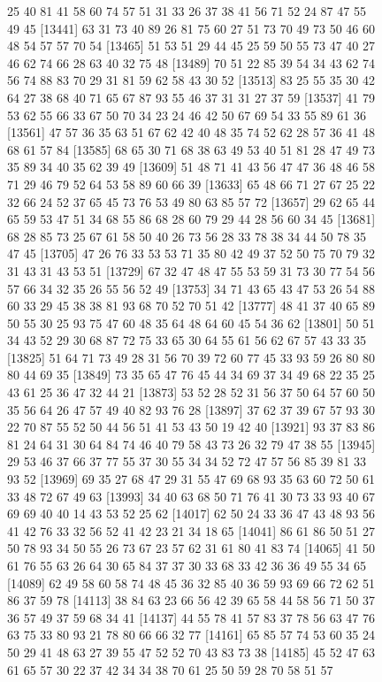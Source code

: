 \documentclass{article}
\begin{document}
\begin{figure}[H]
\begin{Schunk}
\begin{Soutput}
[13417] 25 40 81 41 58 60 74 57 51 31 33 26 37 38 41 56 71 52 24 87 47 55 49 45
[13441] 63 31 73 40 89 26 81 75 60 27 51 73 70 49 73 50 46 60 48 54 57 57 70 54
[13465] 51 53 51 29 44 45 25 59 50 55 73 47 40 27 46 62 74 66 28 63 40 32 75 48
[13489] 70 51 22 85 39 54 34 43 62 74 56 74 88 83 70 29 31 81 59 62 58 43 30 52
[13513] 83 25 55 35 30 42 64 27 38 68 40 71 65 67 87 93 55 46 37 31 31 27 37 59
[13537] 41 79 53 62 55 66 33 67 50 70 34 23 24 46 42 50 67 69 54 33 55 89 61 36
[13561] 47 57 36 35 63 51 67 62 42 40 48 35 74 52 62 28 57 36 41 48 68 61 57 84
[13585] 68 65 30 71 68 38 63 49 53 40 51 81 28 47 49 73 35 89 34 40 35 62 39 49
[13609] 51 48 71 41 43 56 47 47 36 48 46 58 71 29 46 79 52 64 53 58 89 60 66 39
[13633] 65 48 66 71 27 67 25 22 32 66 24 52 37 65 45 73 76 53 49 80 63 85 57 72
[13657] 29 62 65 44 65 59 53 47 51 34 68 55 86 68 28 60 79 29 44 28 56 60 34 45
[13681] 68 28 85 73 25 67 61 58 50 40 26 73 56 28 33 78 38 34 44 50 78 35 47 45
[13705] 47 26 76 33 53 53 71 35 80 42 49 37 52 50 75 70 79 32 31 43 31 43 53 51
[13729] 67 32 47 48 47 55 53 59 31 73 30 77 54 56 57 66 34 32 35 26 55 56 52 49
[13753] 34 71 43 65 43 47 53 26 54 88 60 33 29 45 38 38 81 93 68 70 52 70 51 42
[13777] 48 41 37 40 65 89 50 55 30 25 93 75 47 60 48 35 64 48 64 60 45 54 36 62
[13801] 50 51 34 43 52 29 30 68 87 72 75 33 65 30 64 55 61 56 62 67 57 43 33 35
[13825] 51 64 71 73 49 28 31 56 70 39 72 60 77 45 33 93 59 26 80 80 80 44 69 35
[13849] 73 35 65 47 76 45 44 34 69 37 34 49 68 22 35 25 43 61 25 36 47 32 44 21
[13873] 53 52 28 52 31 56 37 50 64 57 60 50 35 56 64 26 47 57 49 40 82 93 76 28
[13897] 37 62 37 39 67 57 93 30 22 70 87 55 52 50 44 56 51 41 53 43 50 19 42 40
[13921] 93 37 83 86 81 24 64 31 30 64 84 74 46 40 79 58 43 73 26 32 79 47 38 55
[13945] 29 53 46 37 66 37 77 55 37 30 55 34 34 52 72 47 57 56 85 39 81 33 93 52
[13969] 69 35 27 68 47 29 31 55 47 69 68 93 35 63 60 72 50 61 33 48 72 67 49 63
[13993] 34 40 63 68 50 71 76 41 30 73 33 93 40 67 69 69 40 40 14 43 53 52 25 62
[14017] 62 50 24 33 36 47 43 48 93 56 41 42 76 33 32 56 52 41 42 23 21 34 18 65
[14041] 86 61 86 50 51 27 50 78 93 34 50 55 26 73 67 23 57 62 31 61 80 41 83 74
[14065] 41 50 61 76 55 63 26 64 30 65 84 37 37 30 33 68 33 42 36 36 49 55 34 65
[14089] 62 49 58 60 58 74 48 45 36 32 85 40 36 59 93 69 66 72 62 51 86 37 59 78
[14113] 38 84 63 23 66 56 42 39 65 58 44 58 56 71 50 37 36 57 49 37 59 68 34 41
[14137] 44 55 78 41 57 83 37 78 56 63 47 76 63 75 33 80 93 21 78 80 66 66 32 77
[14161] 65 85 57 74 53 60 35 24 50 29 41 48 63 27 39 55 47 52 52 70 43 83 73 38
[14185] 45 52 47 63 61 65 57 30 22 37 42 34 34 38 70 61 25 50 59 28 70 58 51 57

\end{Soutput}
\end{Schunk}
\end{figure}
\end{document}
